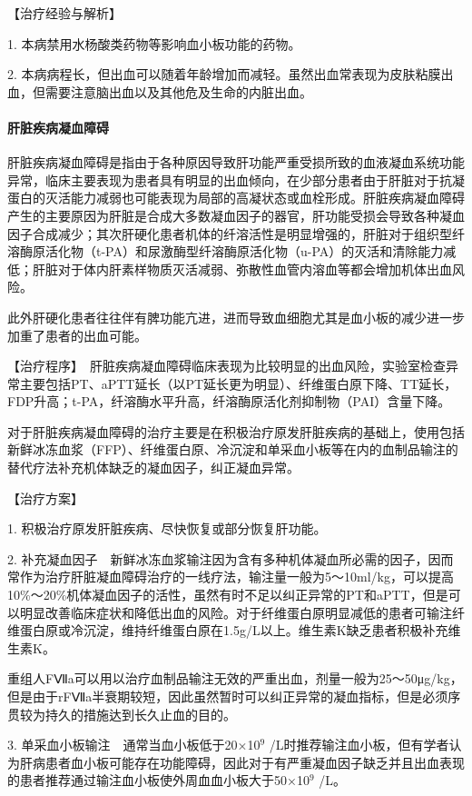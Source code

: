 【治疗经验与解析】

1. 本病禁用水杨酸类药物等影响血小板功能的药物。

2.
本病病程长，但出血可以随着年龄增加而减轻。虽然出血常表现为皮肤粘膜出血，但需要注意脑出血以及其他危及生命的内脏出血。

\paragraph{肝脏疾病凝血障碍}

肝脏疾病凝血障碍是指由于各种原因导致肝功能严重受损所致的血液凝血系统功能异常，临床主要表现为患者具有明显的出血倾向，在少部分患者由于肝脏对于抗凝蛋白的灭活能力减弱也可能表现为局部的高凝状态或血栓形成。肝脏疾病凝血障碍产生的主要原因为肝脏是合成大多数凝血因子的器官，肝功能受损会导致各种凝血因子合成减少；其次肝硬化患者机体的纤溶活性是明显增强的，肝脏对于组织型纤溶酶原活化物（t-PA）和尿激酶型纤溶酶原活化物（u-PA）的灭活和清除能力减低；肝脏对于体内肝素样物质灭活减弱、弥散性血管内溶血等都会增加机体出血风险。

此外肝硬化患者往往伴有脾功能亢进，进而导致血细胞尤其是血小板的减少进一步加重了患者的出血可能。

【治疗程序】　肝脏疾病凝血障碍临床表现为比较明显的出血风险，实验室检查异常主要包括PT、aPTT延长（以PT延长更为明显）、纤维蛋白原下降、TT延长，FDP升高；t-PA，纤溶酶水平升高，纤溶酶原活化剂抑制物（PAI）含量下降。

对于肝脏疾病凝血障碍的治疗主要是在积极治疗原发肝脏疾病的基础上，使用包括新鲜冰冻血浆（FFP）、纤维蛋白原、冷沉淀和单采血小板等在内的血制品输注的替代疗法补充机体缺乏的凝血因子，纠正凝血异常。

【治疗方案】

1. 积极治疗原发肝脏疾病、尽快恢复或部分恢复肝功能。

2.
补充凝血因子　新鲜冰冻血浆输注因为含有多种机体凝血所必需的因子，因而常作为治疗肝脏凝血障碍治疗的一线疗法，输注量一般为5～10ml/kg，可以提高10\%～20\%机体凝血因子的活性，虽然有时不足以纠正异常的PT和aPTT，但是可以明显改善临床症状和降低出血的风险。对于纤维蛋白原明显减低的患者可输注纤维蛋白原或冷沉淀，维持纤维蛋白原在1.5g/L以上。维生素K缺乏患者积极补充维生素K。

重组人FⅦa可以用以治疗血制品输注无效的严重出血，剂量一般为25～50μg/kg，但是由于rFⅦa半衰期较短，因此虽然暂时可以纠正异常的凝血指标，但是必须序贯较为持久的措施达到长久止血的目的。

3. 单采血小板输注　通常当血小板低于20×10$^{9}$
/L时推荐输注血小板，但有学者认为肝病患者血小板可能存在功能障碍，因此对于有严重凝血因子缺乏并且出血表现的患者推荐通过输注血小板使外周血血小板大于50×10$^{9}$
/L。


